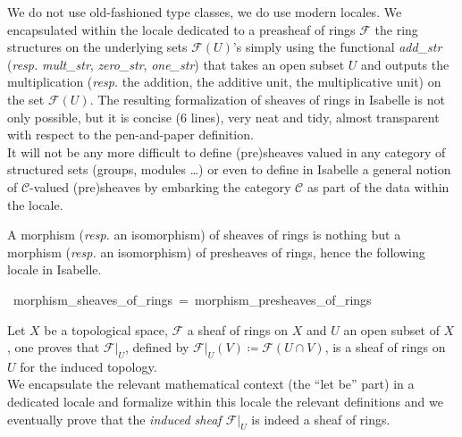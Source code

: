\documentclass[12pt]{scrartcl}
\begin{document}
We do not use old-fashioned type classes, we do use modern locales. We encapsulated within the locale dedicated to a preasheaf of rings $\mathscr{F}$ the ring structures on the underlying sets $\mathscr{F}(U)$'s simply using the functional \textit{add\_str} (\textit{resp.} \textit{mult\_str}, \textit{zero\_str}, \textit{one\_str}) that takes an open subset $U$ and outputs the multiplication (\textit{resp.} the addition, the additive unit, the multiplicative unit) on the set $\mathscr{F}(U)$. The resulting formalization of sheaves of rings in Isabelle is not only possible, but it is concise (6 lines), very neat and tidy, almost transparent with respect to the pen-and-paper definition. \\
It will not be any more difficult to define (pre)sheaves valued in any category of structured sets (groups, modules \dots) or even to define in Isabelle a general notion of $\mathscr{C}$-valued (pre)sheaves by embarking the category $\mathscr{C}$ as part of the data within the locale.  	


A morphism (\textit{resp.} an isomorphism) of sheaves of rings is nothing but a morphism (\textit{resp.} an isomorphism) of presheaves of rings, hence the following locale in Isabelle.

\begin{isabelle}
\ morphism\_sheaves\_of\_rings\ =\ morphism\_presheaves\_of\_rings
\end{isabelle}

Let $X$ be a topological space, $\mathscr{F}$ a sheaf of rings on $X$ and $U$ an open subset of $X$,  one proves that $\mathscr{F}|_U$, defined by $\mathscr{F}|_U(V) \coloneqq \mathscr{F}(U \cap V)$, is a sheaf of rings on $U$ for the induced topology. \\
We encapsulate the relevant mathematical context (the ``let be'' part) in a dedicated locale and formalize within this locale the relevant definitions and we eventually prove  that the \emph{induced sheaf $\mathscr{F}|_U$} is indeed a sheaf of rings.
\end{document}
